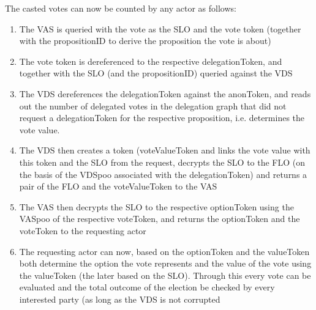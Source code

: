 The casted votes can now be counted by any actor as follows:
\begin{enumerate}
\item The VAS is queried with the vote as the SLO and the vote token (together with the propositionID to derive the proposition the vote is about)
\item The vote token is dereferenced to the respective delegationToken, and together with the SLO (and the propositionID) queried against the VDS
\item The VDS dereferences the delegationToken against the anonToken, and reads out the number of delegated votes in the delegation graph that did not request a delegationToken for the respective proposition, i.e. determines the vote value.
\item The VDS then creates a token (voteValueToken and links the vote value with this token and the SLO from the request, decrypts the SLO to the FLO (on the basis of the VDSpoo associated with the delegationToken) and returns a pair of the FLO and the voteValueToken to the VAS
\item The VAS then decrypts the SLO to the respective optionToken using the VASpoo of the respective voteToken, and returns the optionToken and the voteToken to the requesting actor
\item The requesting actor can now, based on the optionToken and the valueToken both determine the option the vote represents and the value of the vote using the valueToken (the later based on the SLO). Through this every vote can be evaluated and the total outcome of the election be checked by every interested party (as long as the VDS is not corrupted
\end{enumerate}

